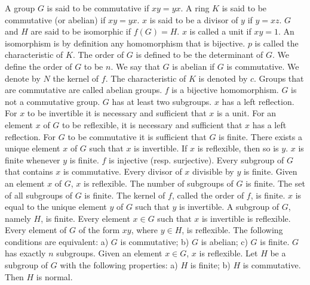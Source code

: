 A group $G$ is said to be commutative if $x y = y x$.
A ring $K$ is said to be commutative (or abelian) if $x y = y x$.
$x$ is said to be a divisor of $y$ if $y = x z$.
$G$ and $H$ are said to be isomorphic if $f(G) = H$.
$x$ is called a unit if $x y = 1$.
An isomorphism is by definition any homomorphism that is bijective.
$p$ is called the characteristic of $K$.
The order of $G$ is defined to be the determinant of $G$.
We define the order of $G$ to be $n$.
We say that $G$ is abelian if $G$ is commutative.
We denote by $N$ the kernel of $f$.
The characteristic of $K$ is denoted by $c$.
Groups that are commutative are called abelian groups.
$f$ is a bijective homomorphism.
$G$ is not a commutative group.
$G$ has at least two subgroups.
$x$ has a left reflection.
For $x$ to be invertible it is necessary and sufficient that $x$ is a unit.
For an element $x$ of $G$ to be reflexible, it is necessary and sufficient that $x$ has a left reflection.
For $G$ to be commutative it is sufficient that $G$ is finite.
There exists a unique element $x$ of $G$ such that $x$ is invertible.
If $x$ is reflexible, then so is $y$.
$x$ is finite whenever $y$ is finite.
$f$ is injective (resp. surjective).
Every subgroup of $G$ that contains $x$ is commutative.
Every divisor of $x$ divisible by $y$ is finite.
Given an element $x$ of $G$, $x$ is reflexible.
The number of subgroups of $G$ is finite.
The set of all subgroups of $G$ is finite.
The kernel of $f$, called the order of $f$, is finite.
$x$ is equal to the unique element $y$ of $G$ such that $y$ is invertible.
A subgroup of $G$, namely $H$, is finite.
Every element $x \in G$ such that $x$ is invertible is reflexible.
Every element of $G$ of the form $x y$, where $y \in H$, is reflexible.
The following conditions are equivalent: a) $G$ is commutative; b) $G$ is abelian; c) $G$ is finite.
$G$ has exactly $n$ subgroups.
Given an element $x \in G$, $x$ is reflexible.
Let $H$ be a subgroup of $G$ with the following properties: a) $H$ is finite; b) $H$ is commutative. Then $H$ is normal.
